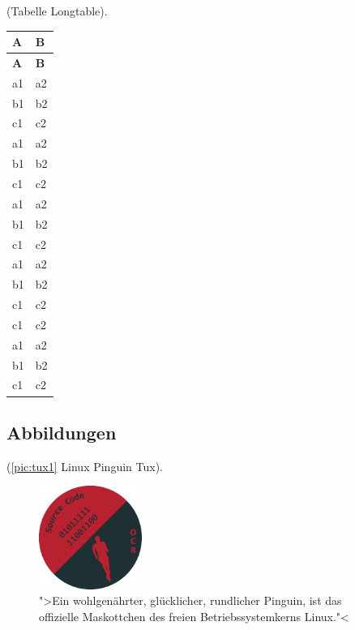(Tabelle Longtable).
\begin{longtable}{ll}%
	\toprule
	\textbf{A} & \textbf{B} \\
	\midrule
	\endfirsthead
	\toprule
	\textbf{A} & \textbf{B} \\
	\midrule
	\endhead
	a1 & a2 \\
	b1 & b2 \\
	c1 & c2 \\
	a1 & a2 \\
	b1 & b2 \\
	c1 & c2 \\
	a1 & a2 \\
	b1 & b2 \\
	c1 & c2 \\
	a1 & a2 \\
	b1 & b2 \\
	c1 & c2 \\
	c1 & c2 \\
	a1 & a2 \\
	b1 & b2 \\
	c1 & c2 \\
	\bottomrule
\end{longtable}

\newpage %

\subsection{Abbildungen}\label{sec:abbildungen}

(\autoref{pic:tux1} Linux Pinguin Tux).
\begin{figure}[!hb] %
	\centering
  \includegraphics[width=0.3\textwidth]{img/logo.pdf}
	\caption[Tux]{">Ein wohlgenährter, glücklicher, rundlicher Pinguin, ist das
									offizielle Maskottchen des freien Betriebssystemkerns Linux."<
	}%
	\label{pic:tux1}%
\end{figure}

